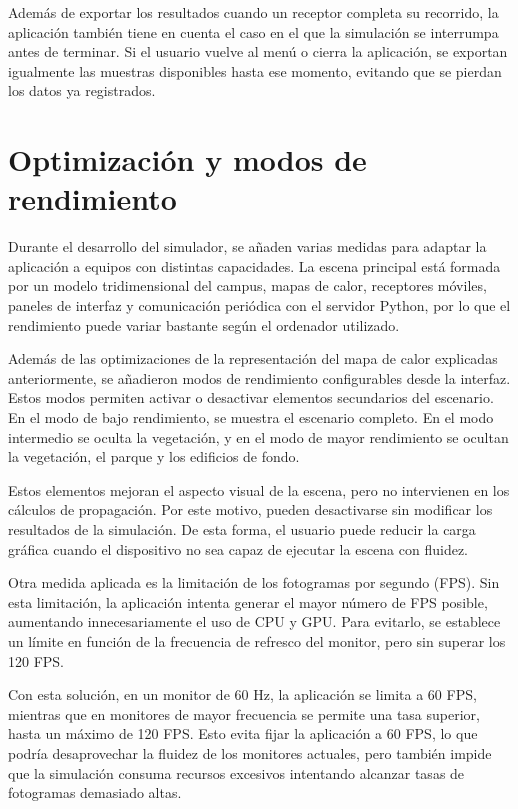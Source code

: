 Además de exportar los resultados cuando un receptor completa su recorrido, la aplicación también tiene en cuenta el caso en el que la simulación se interrumpa antes de terminar. Si el usuario vuelve al menú o cierra la aplicación, se exportan igualmente las muestras disponibles hasta ese momento, evitando que se pierdan los datos ya registrados.

\section{Optimización y modos de rendimiento}

Durante el desarrollo del simulador, se añaden varias medidas para adaptar la aplicación a equipos con distintas capacidades. La escena principal está formada por un modelo tridimensional del campus, mapas de calor, receptores móviles, paneles de interfaz y comunicación periódica con el servidor Python, por lo que el rendimiento puede variar bastante según el ordenador utilizado.

Además de las optimizaciones de la representación del mapa de calor explicadas anteriormente, se añadieron modos de rendimiento configurables desde la interfaz. Estos modos permiten activar o desactivar elementos secundarios del escenario. En el modo de bajo rendimiento, se muestra el escenario completo. En el modo intermedio se oculta la vegetación, y en el modo de mayor rendimiento se ocultan la vegetación, el parque y los edificios de fondo.

Estos elementos mejoran el aspecto visual de la escena, pero no intervienen en los cálculos de propagación. Por este motivo, pueden desactivarse sin modificar los resultados de la simulación. De esta forma, el usuario puede reducir la carga gráfica cuando el dispositivo no sea capaz de ejecutar la escena con fluidez.

Otra medida aplicada es la limitación de los fotogramas por segundo (FPS). Sin esta limitación, la aplicación intenta generar el mayor número de FPS posible, aumentando innecesariamente el uso de CPU y GPU. Para evitarlo, se establece un límite en función de la frecuencia de refresco del monitor, pero sin superar los 120 FPS.

Con esta solución, en un monitor de 60 Hz, la aplicación se limita a 60 FPS, mientras que en monitores de mayor frecuencia se permite una tasa superior, hasta un máximo de 120 FPS. Esto evita fijar la aplicación a 60 FPS, lo que podría desaprovechar la fluidez de los monitores actuales, pero también impide que la simulación consuma recursos excesivos intentando alcanzar tasas de fotogramas demasiado altas.
